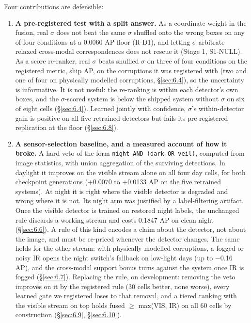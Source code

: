 \documentclass[10pt]{article}
\begin{document}
Four contributions are defensible:

\begin{enumerate}
\item \textbf{A pre-registered test with a split answer.} As a coordinate weight in the fusion, real $\sigma$ does not beat the same $\sigma$ shuffled onto the wrong boxes on any of four conditions at a 0.0060 AP floor (R-D1), and letting $\sigma$ arbitrate relaxed cross-modal correspondences does not rescue it (Stage 1, S1-NULL). As a score re-ranker, real $\sigma$ beats shuffled $\sigma$ on three of four conditions on the registered metric, ship AP, on the corruptions it was registered with (two and one of four on physically modelled corruptions, \S\ref{sec:6.4}), so the uncertainty is informative. It is not useful: the re-ranking is within each detector's own boxes, and the $\sigma$-scored system is below the shipped system without $\sigma$ on six of eight cells (\S\ref{sec:6.4}). Learned jointly with confidence, $\sigma$'s within-detector gain is positive on all five retrained detectors but fails its pre-registered replication at the floor (\S\ref{sec:6.8}).
\item \textbf{A sensor-selection baseline, and a measured account of how it broke.} A hard veto of the form \texttt{night AND (dark OR veil)}, computed from image statistics, with union aggregation of the surviving detections. In daylight it improves on the visible stream alone on all four day cells, for both checkpoint generations (+0.0070 to +0.0133 AP on the five retrained systems). At night it is right where the visible detector is degraded and wrong where it is not. Its night arm was justified by a label-filtering artifact. Once the visible detector is trained on restored night labels, the unchanged rule discards a working stream and costs 0.1847 AP on clean night (\S\ref{sec:6.6}). A rule of this kind encodes a claim about the detector, not about the image, and must be re-priced whenever the detector changes. The same holds for the other stream: with physically modelled corruptions, a fogged or noisy IR opens the night switch's fallback on low-light days (up to $-$0.16 AP), and the cross-modal support bonus turns against the system once IR is fogged (\S\ref{sec:6.7}). Replacing the rule, on development: removing the veto improves on it by the registered rule (30 cells better, none worse), every learned gate we registered loses to that removal, and a tiered ranking with the visible stream on top holds fused $\geq$ max(VIS, IR) on all 60 cells by construction (\S\ref{sec:6.9}, \S\ref{sec:6.10}).

\end{enumerate}
\end{document}
